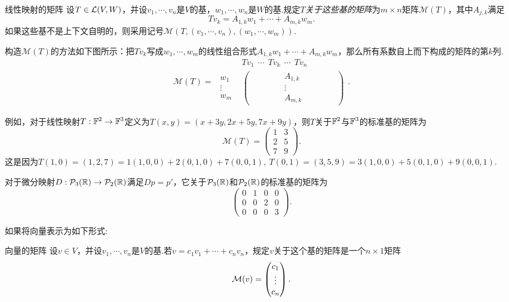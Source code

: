 \begin{definition}{线性映射的矩阵}
	设$T \in \mathcal{L} (V,W)$，并设$v_1, \cdots ,v_n$是$V$的基，$w_1, \cdots ,w_n$是$W$的基.规定$T$\textit{关于这些基的矩阵}为$m \times n$矩阵$\mathcal{M}(T)$，其中$A_{j,k}$满足$$Tv_k = A_{1,k}w_1 + \cdots + A_{m,k}w_m.$$
	如果这些基不是上下文自明的，则采用记号$\mathcal{M}(T,(v_1, \cdots ,v_n),(w_1, \cdots ,w_m))$.
\end{definition}

构造$\mathcal{M}(T)$的方法如下图所示：把$Tv_k$写成$w_1, \cdots ,w_m$的线性组合形式$A_{1,k} w_1 + \cdots + A_{m,k} w_m$，那么所有系数自上而下构成的矩阵的第$k$列.
	$$\mathcal{M}(T) = \begin{matrix}
  	& Tv_1~~ \cdots ~~Tv_k~~ \cdots ~~Tv_n\\
	\begin{matrix} w_1 \\ \vdots \\ w_m \end{matrix}  
	&\begin{pmatrix} ~~~~~ & ~~~~~ & A_{1,k} & ~~~~~ & ~~~~~\\  &  & \vdots &  & \\  &  & A_{m,k} &  & \end{pmatrix}
	\end{matrix}.$$

例如，对于线性映射$T:\mathbb{F} ^2 \to \mathbb{F} ^3$定义为$T(x,y)=(x+3y,2x+5y,7x+9y)$，则$T$关于$\mathbb{F} ^2$与$\mathbb{F} ^3$的标准基的矩阵为$$\mathcal{M}(T)= \begin{pmatrix}
	1 & 3 \\ 2 & 5 \\ 7 & 9
\end{pmatrix}.$$
这是因为$T(1,0)=(1,2,7)=1(1,0,0)+2(0,1,0)+7(0,0,1),~T(0,1)=(3,5,9)=3(1,0,0)+5(0,1,0)+9(0,0,1)$.

对于微分映射$D:\mathcal{P}_3(\mathbb{R}) \to \mathcal{P}_2(\mathbb{R})$满足$Dp=p'$，它关于$\mathcal{P}_3(\mathbb{R})$和$\mathcal{P}_2(\mathbb{R})$的标准基的矩阵为$$\begin{pmatrix}
	0 & 1 & 0 & 0 \\ 0 & 0 & 2 & 0 \\ 0 & 0 & 0 & 3
\end{pmatrix}.$$

如果将向量表示为如下形式: 

\begin{definition}{向量的矩阵}
	设$v \in V$，并设$v_1, \cdots ,v_n$是$V$的基.若$v=c_1v_1 + \cdots + c_nv_n$，规定$v$关于这个基的矩阵是一个$n \times 1$矩阵$$\mathcal{M}(v) = \begin{pmatrix}
		c_1 \\ \vdots \\ c_n
	\end{pmatrix}.$$
\end{definition}

